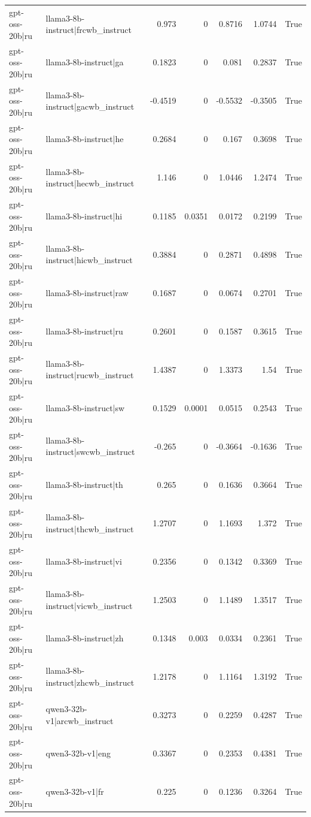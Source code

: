 \begin{table}
\begin{tabular}{l l r r r r l}
gpt-oss-20b|ru & llama3-8b-instruct|frcwb_instruct & 0.973 & 0 & 0.8716 & 1.0744 & True \\
gpt-oss-20b|ru & llama3-8b-instruct|ga & 0.1823 & 0 & 0.081 & 0.2837 & True \\
gpt-oss-20b|ru & llama3-8b-instruct|gacwb_instruct & -0.4519 & 0 & -0.5532 & -0.3505 & True \\
gpt-oss-20b|ru & llama3-8b-instruct|he & 0.2684 & 0 & 0.167 & 0.3698 & True \\
gpt-oss-20b|ru & llama3-8b-instruct|hecwb_instruct & 1.146 & 0 & 1.0446 & 1.2474 & True \\
gpt-oss-20b|ru & llama3-8b-instruct|hi & 0.1185 & 0.0351 & 0.0172 & 0.2199 & True \\
gpt-oss-20b|ru & llama3-8b-instruct|hicwb_instruct & 0.3884 & 0 & 0.2871 & 0.4898 & True \\
gpt-oss-20b|ru & llama3-8b-instruct|raw & 0.1687 & 0 & 0.0674 & 0.2701 & True \\
gpt-oss-20b|ru & llama3-8b-instruct|ru & 0.2601 & 0 & 0.1587 & 0.3615 & True \\
gpt-oss-20b|ru & llama3-8b-instruct|rucwb_instruct & 1.4387 & 0 & 1.3373 & 1.54 & True \\
gpt-oss-20b|ru & llama3-8b-instruct|sw & 0.1529 & 0.0001 & 0.0515 & 0.2543 & True \\
gpt-oss-20b|ru & llama3-8b-instruct|swcwb_instruct & -0.265 & 0 & -0.3664 & -0.1636 & True \\
gpt-oss-20b|ru & llama3-8b-instruct|th & 0.265 & 0 & 0.1636 & 0.3664 & True \\
gpt-oss-20b|ru & llama3-8b-instruct|thcwb_instruct & 1.2707 & 0 & 1.1693 & 1.372 & True \\
gpt-oss-20b|ru & llama3-8b-instruct|vi & 0.2356 & 0 & 0.1342 & 0.3369 & True \\
gpt-oss-20b|ru & llama3-8b-instruct|vicwb_instruct & 1.2503 & 0 & 1.1489 & 1.3517 & True \\
gpt-oss-20b|ru & llama3-8b-instruct|zh & 0.1348 & 0.003 & 0.0334 & 0.2361 & True \\
gpt-oss-20b|ru & llama3-8b-instruct|zhcwb_instruct & 1.2178 & 0 & 1.1164 & 1.3192 & True \\
gpt-oss-20b|ru & qwen3-32b-v1|arcwb_instruct & 0.3273 & 0 & 0.2259 & 0.4287 & True \\
gpt-oss-20b|ru & qwen3-32b-v1|eng & 0.3367 & 0 & 0.2353 & 0.4381 & True \\
gpt-oss-20b|ru & qwen3-32b-v1|fr & 0.225 & 0 & 0.1236 & 0.3264 & True \\

\end{tabular}
\end{table}
